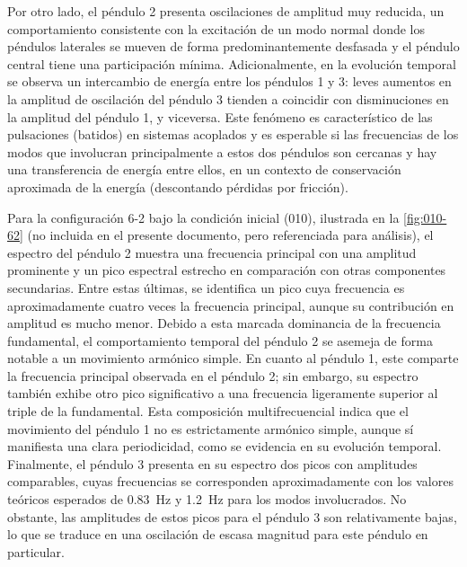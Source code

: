 Por otro lado, el p\'endulo 2 presenta oscilaciones de amplitud muy
reducida, un comportamiento consistente con la excitaci\'on de un
modo normal donde los p\'endulos laterales se mueven de forma
predominantemente desfasada y el p\'endulo central tiene una
participaci\'on m\'inima. Adicionalmente, en la evoluci\'on temporal
se observa un intercambio de energ\'ia entre los p\'endulos 1 y 3:
leves aumentos en la amplitud de oscilaci\'on del p\'endulo 3 tienden
a coincidir con disminuciones en la amplitud del p\'endulo 1, y
viceversa. Este fen\'omeno es caracter\'istico de las pulsaciones
(batidos) en sistemas acoplados y es esperable si las frecuencias
de los modos que involucran principalmente a estos dos p\'endulos son
cercanas y hay una transferencia de energ\'ia entre ellos, en un
contexto de conservaci\'on aproximada de la energ\'ia (descontando
p\'erdidas por fricci\'on).

Para la configuraci\'on 6-2 bajo la condici\'on inicial (010),
ilustrada en la \cref{fig:010-62} (no incluida en el presente
documento, pero referenciada para an\'alisis), el espectro del
p\'endulo 2 muestra una frecuencia principal con una amplitud
prominente y un pico espectral estrecho en comparaci\'on con otras
componentes secundarias. Entre estas \'ultimas, se identifica un pico
cuya frecuencia es aproximadamente cuatro veces la frecuencia
principal, aunque su contribuci\'on en amplitud es mucho menor.
Debido a esta marcada dominancia de la frecuencia fundamental, el
comportamiento temporal del p\'endulo 2 se asemeja de forma notable
a un movimiento arm\'onico simple. En cuanto al p\'endulo 1, este
comparte la frecuencia principal observada en el p\'endulo 2; sin
embargo, su espectro tambi\'en exhibe otro pico significativo a una
frecuencia ligeramente superior al triple de la fundamental. Esta
composici\'on multifrecuencial indica que el movimiento del p\'endulo
1 no es estrictamente arm\'onico simple, aunque s\'i manifiesta una
clara periodicidad, como se evidencia en su evoluci\'on temporal.
Finalmente, el p\'endulo 3 presenta en su espectro dos picos con
amplitudes comparables, cuyas frecuencias se corresponden
aproximadamente con los valores te\'oricos esperados de \qty{0.83}{\Hz}
y \qty{1.2}{\Hz} para los modos involucrados. No obstante, las
amplitudes de estos picos para el p\'endulo 3 son relativamente
bajas, lo que se traduce en una oscilaci\'on de escasa magnitud para
este p\'endulo en particular.

